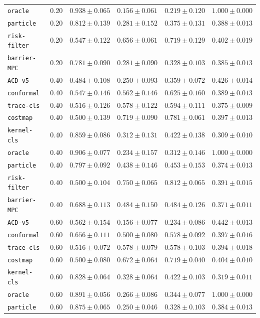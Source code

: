 \documentclass{article}
\begin{document}
\begin{center}
{\begin{tabular}{llcccc}
\texttt{oracle} & 0.20 & $0.938 \pm 0.065$ & $0.156 \pm 0.061$ & $0.219 \pm 0.120$ & $1.000 \pm 0.000$ \\
\texttt{particle} & 0.20 & $0.812 \pm 0.139$ & $0.281 \pm 0.152$ & $0.375 \pm 0.131$ & $0.388 \pm 0.013$ \\
\texttt{risk-filter} & 0.20 & $0.547 \pm 0.122$ & $0.656 \pm 0.061$ & $0.719 \pm 0.129$ & $0.402 \pm 0.019$ \\
\texttt{barrier-MPC} & 0.20 & $0.781 \pm 0.090$ & $0.281 \pm 0.090$ & $0.328 \pm 0.103$ & $0.385 \pm 0.013$ \\
\texttt{ACD-v5} & 0.40 & $0.484 \pm 0.108$ & $0.250 \pm 0.093$ & $0.359 \pm 0.072$ & $0.426 \pm 0.014$ \\
\texttt{conformal} & 0.40 & $0.547 \pm 0.146$ & $0.562 \pm 0.146$ & $0.625 \pm 0.160$ & $0.389 \pm 0.013$ \\
\texttt{trace-cls} & 0.40 & $0.516 \pm 0.126$ & $0.578 \pm 0.122$ & $0.594 \pm 0.111$ & $0.375 \pm 0.009$ \\
\texttt{costmap} & 0.40 & $0.500 \pm 0.139$ & $0.719 \pm 0.090$ & $0.781 \pm 0.061$ & $0.397 \pm 0.013$ \\
\texttt{kernel-cls} & 0.40 & $0.859 \pm 0.086$ & $0.312 \pm 0.131$ & $0.422 \pm 0.138$ & $0.309 \pm 0.010$ \\
\texttt{oracle} & 0.40 & $0.906 \pm 0.077$ & $0.234 \pm 0.157$ & $0.312 \pm 0.146$ & $1.000 \pm 0.000$ \\
\texttt{particle} & 0.40 & $0.797 \pm 0.092$ & $0.438 \pm 0.146$ & $0.453 \pm 0.153$ & $0.374 \pm 0.013$ \\
\texttt{risk-filter} & 0.40 & $0.500 \pm 0.104$ & $0.750 \pm 0.065$ & $0.812 \pm 0.065$ & $0.391 \pm 0.015$ \\
\texttt{barrier-MPC} & 0.40 & $0.688 \pm 0.113$ & $0.484 \pm 0.150$ & $0.484 \pm 0.126$ & $0.371 \pm 0.011$ \\
\texttt{ACD-v5} & 0.60 & $0.562 \pm 0.154$ & $0.156 \pm 0.077$ & $0.234 \pm 0.086$ & $0.442 \pm 0.013$ \\
\texttt{conformal} & 0.60 & $0.656 \pm 0.111$ & $0.500 \pm 0.080$ & $0.578 \pm 0.092$ & $0.397 \pm 0.016$ \\
\texttt{trace-cls} & 0.60 & $0.516 \pm 0.072$ & $0.578 \pm 0.079$ & $0.578 \pm 0.103$ & $0.394 \pm 0.018$ \\
\texttt{costmap} & 0.60 & $0.500 \pm 0.080$ & $0.672 \pm 0.064$ & $0.719 \pm 0.040$ & $0.404 \pm 0.010$ \\
\texttt{kernel-cls} & 0.60 & $0.828 \pm 0.064$ & $0.328 \pm 0.064$ & $0.422 \pm 0.103$ & $0.319 \pm 0.011$ \\
\texttt{oracle} & 0.60 & $0.891 \pm 0.056$ & $0.266 \pm 0.086$ & $0.344 \pm 0.077$ & $1.000 \pm 0.000$ \\
\texttt{particle} & 0.60 & $0.875 \pm 0.065$ & $0.250 \pm 0.046$ & $0.328 \pm 0.103$ & $0.384 \pm 0.013$ \\
\bottomrule
\end{tabular}%
}
\end{center}
\end{document}
